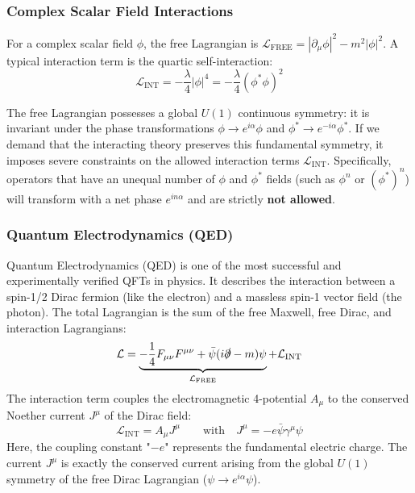 \subsubsection{Complex Scalar Field Interactions}

For a complex scalar field \(\phi\), the free Lagrangian is \(\mathcal{L}_{\text{FREE}} = |\partial_\mu \phi|^2 - m^2 |\phi|^2\). A typical interaction term is the quartic self-interaction:
\[
    \mathcal{L}_{\text{INT}} = -\frac{\lambda}{4} |\phi|^4 = -\frac{\lambda}{4} (\phi^* \phi)^2
\]
\begin{remark}
    The free Lagrangian possesses a global \(U(1)\) continuous symmetry: it is invariant under the phase transformations \(\phi \to e^{i\alpha} \phi\) and \(\phi^* \to e^{-i\alpha} \phi^*\). If we demand that the interacting theory preserves this fundamental symmetry, it imposes severe constraints on the allowed interaction terms \(\mathcal{L}_{\text{INT}}\). Specifically, operators that have an unequal number of \(\phi\) and \(\phi^*\) fields (such as \(\phi^n\) or \((\phi^*)^n\)) will transform with a net phase \(e^{in\alpha}\) and are strictly \textbf{not allowed}.
\end{remark}

\subsubsection{Quantum Electrodynamics (QED)}

Quantum Electrodynamics (QED) is one of the most successful and experimentally verified QFTs in physics. It describes the interaction between a spin-1/2 Dirac fermion (like the electron) and a massless spin-1 vector field (the photon).
The total Lagrangian is the sum of the free Maxwell, free Dirac, and interaction Lagrangians:
\[
    \mathcal{L} = \underbrace{-\frac{1}{4}F_{\mu\nu}F^{\mu\nu} + \bar{\psi}(i\slashed{\partial} - m)\psi}_{\mathcal{L}_{\text{FREE}}} + \mathcal{L}_{\text{INT}}
\]
The interaction term couples the electromagnetic 4-potential \(A_\mu\) to the conserved Noether current \(J^\mu\) of the Dirac field:
\[
    \mathcal{L}_{\text{INT}} = A_\mu J^\mu \qquad \text{with} \quad J^\mu = -e \bar{\psi}\gamma^\mu\psi
\]
Here, the coupling constant "\(-e\)" represents the fundamental electric charge. The current \(J^\mu\) is exactly the conserved current arising from the global \(U(1)\) symmetry of the free Dirac Lagrangian (\(\psi \to e^{i\alpha}\psi\)).

